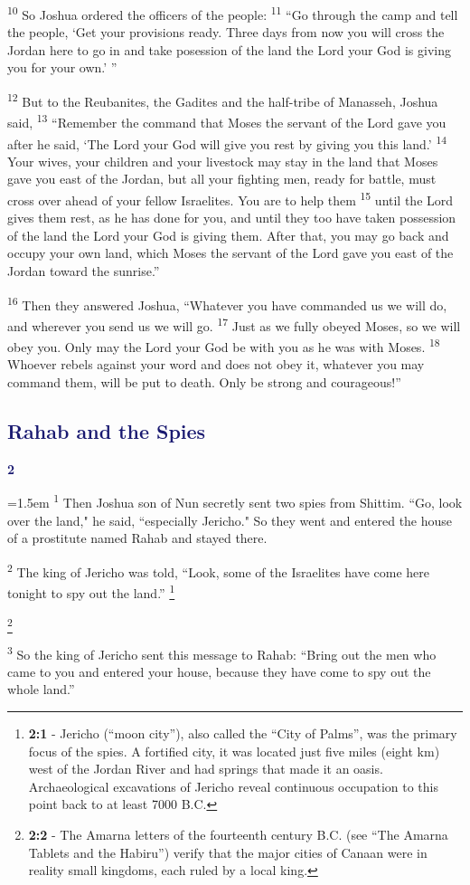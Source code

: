 \documentclass[12pt,twoside]{article}
\newcommand{\vs}[1]{\textsuperscript{#1}}
\newcommand{\vnote}[2]{%
  \begingroup
  \renewcommand\thefootnote{}%
  \footnote{\scriptsize \textbf{}#2}%
  \addtocounter{footnote}{-1}%
  \endgroup
}
\newcommand{\chapterWithIndent}[2]{%
  \noindent
  \begin{minipage}[t]{1cm}
    \vspace{-0.4\baselineskip}
    {\textcolor{MidnightBlue}{\fontsize{40pt}{48pt}\selectfont \textbf{#1}}}
  \end{minipage}%
  \hspace{0.3cm}%
  \begin{minipage}[t]{\dimexpr\linewidth - 1.5cm - 0.3cm\relax}
    \hangindent=1.5em
    \hangafter=3
    #2
    \vspace{0.05cm}
  \end{minipage}
}
\begin{document}
\vs{10} So Joshua ordered the officers of the people:
\vs{11} ``Go through the camp and tell the people, `Get your provisions ready. Three days from now you will cross the Jordan here to go in and take posession of the land the Lord your God is giving you for your own.' ''

\vs{12} But to the Reubanites, the Gadites and the half-tribe of Manasseh, Joshua said,
\vs{13} ``Remember the command that Moses the servant of the Lord gave you after he said, `The Lord your God will give you rest by giving you this land.'
\vs{14} Your wives, your children and your livestock may stay in the land that Moses gave you east of the Jordan, but all your fighting men, ready for battle, must cross over ahead of your fellow Israelites. You are to help them
\vs{15} until the Lord gives them rest, as he has done for you, and until they too have taken possession of the land the Lord your God is giving them. After that, you may go back and occupy your own land, which Moses the servant of the Lord gave you east of the Jordan toward the sunrise.''

\vs{16} Then they answered Joshua, ``Whatever you have commanded us we will do, and wherever you send us we will go.
\vs{17} Just as we fully obeyed Moses, so we will obey you. Only may the Lord your God be with you as he was with Moses.
\vs{18} Whoever rebels against your word and does not obey it, whatever you may command them, will be put to death. Only be strong and courageous!''

\subsection*{\textcolor{MidnightBlue}{\textbf{Rahab and the Spies}}}

\chapterWithIndent{2}{%
  \vs{1} Then Joshua son of Nun secretly sent two spies from Shittim. ``Go, look over the land," he said, ``especially Jericho." So they went and entered the house of a prostitute named Rahab and stayed there.
}

\vs{2} The king of Jericho was told, ``Look, some of the Israelites have come here tonight to spy out the land.''\vnote{1}{\textbf{2:1} - Jericho (“moon city”), also called the “City of Palms”, was the primary focus of the spies. A fortified city, it was located just five miles (eight km) west of the Jordan River and had springs that made it an oasis. Archaeological excavations of Jericho reveal continuous occupation to this point back to at least 7000 B.C.}\vnote{2}{\textbf{2:2} - The Amarna letters of the fourteenth century B.C. (see “The Amarna Tablets and the Habiru”) verify that the major cities of Canaan were in reality small kingdoms, each ruled by a local king.}
\vs{3} So the king of Jericho sent this message to Rahab: ``Bring out the men who came to you and entered your house, because they have come to spy out the whole land.''
\end{document}
